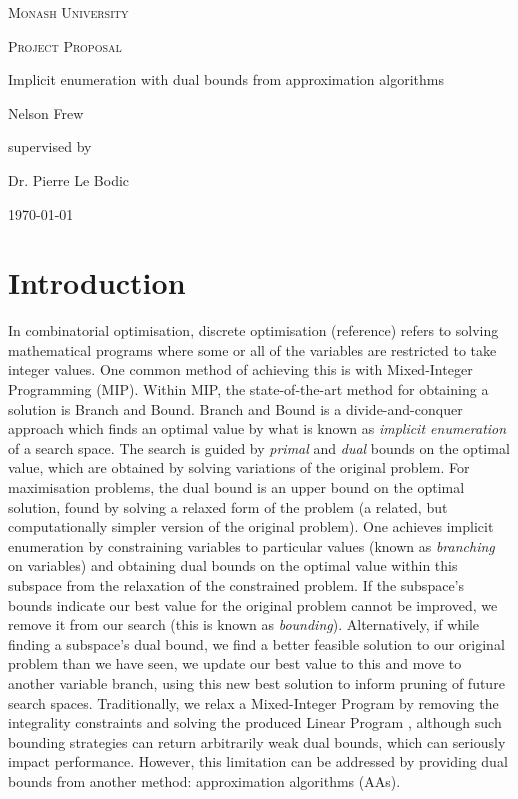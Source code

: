\documentclass[12pt, a4paper]{article}
\begin{document}
\begin{titlepage}
  \centering
  {\scshape\LARGE Monash University \par}
  \vspace{1cm}
  {\scshape\Large Project Proposal \par}
  \vspace{1.5cm}
  {\huge Implicit enumeration with dual bounds from approximation algorithms\par}
  \vspace{2cm}
  {\Large Nelson Frew\par}
  \vfill
  supervised by\par
  Dr. Pierre Le Bodic
  \vfill
  {\large \today\par}
\end{titlepage}
\tableofcontents
\newpage
\section{Introduction}
In combinatorial optimisation, discrete optimisation (reference) refers to solving mathematical programs where some or all of the variables are restricted to take integer values. One common method of achieving this is with Mixed-Integer Programming (MIP). Within MIP, the state-of-the-art method for obtaining a solution is Branch and Bound. Branch and Bound is a divide-and-conquer approach which finds an optimal value by what is known as \emph{implicit enumeration} of a search space. The search is guided by \emph{primal} and \emph{dual} bounds on the optimal value, which are obtained by solving variations of the original problem. For maximisation problems, the dual bound is an upper bound on the optimal solution, found by solving a relaxed form of the problem (a related, but computationally simpler version of the original problem). One achieves implicit enumeration by constraining variables to particular values (known as \emph{branching} on variables) and obtaining dual bounds on the optimal value within this subspace from the relaxation of the constrained problem. If the subspace's bounds indicate our best value for the original problem cannot be improved, we remove it from our search (this is known as \emph{bounding}). Alternatively, if while finding a subspace's dual bound, we find a better feasible solution to our original problem than we have seen, we update our best value to this and move to another variable branch, using this new best solution to inform pruning of future search spaces. Traditionally, we relax a Mixed-Integer Program by removing the integrality constraints and solving the produced Linear Program , although such bounding strategies can return arbitrarily weak dual bounds, which can seriously impact performance. However, this limitation can be addressed by providing dual bounds from another method: approximation algorithms (AAs).  
\end{document}
